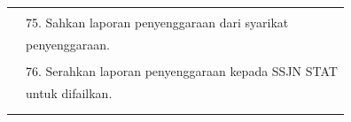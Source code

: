 \documentclass[
]{article}
\begin{document}
\begin{longtable}[]{@{}ll@{}}
\begin{minipage}[t]{0.23\columnwidth}\raggedright
\strut
\end{minipage} & \begin{minipage}[t]{0.71\columnwidth}\raggedright
\strut
\end{minipage}\tabularnewline
\begin{minipage}[t]{0.23\columnwidth}\raggedright
\strut
\end{minipage} & \begin{minipage}[t]{0.71\columnwidth}\raggedright
75. Sahkan laporan penyenggaraan dari syarikat\strut
\end{minipage}\tabularnewline
\begin{minipage}[t]{0.23\columnwidth}\raggedright
\strut
\end{minipage} & \begin{minipage}[t]{0.71\columnwidth}\raggedright
penyenggaraan.\strut
\end{minipage}\tabularnewline
\begin{minipage}[t]{0.23\columnwidth}\raggedright
\strut
\end{minipage} & \begin{minipage}[t]{0.71\columnwidth}\raggedright
\strut
\end{minipage}\tabularnewline
\begin{minipage}[t]{0.23\columnwidth}\raggedright
\strut
\end{minipage} & \begin{minipage}[t]{0.71\columnwidth}\raggedright
76. Serahkan laporan penyenggaraan kepada SSJN STAT\strut
\end{minipage}\tabularnewline
\begin{minipage}[t]{0.23\columnwidth}\raggedright
\strut
\end{minipage} & \begin{minipage}[t]{0.71\columnwidth}\raggedright
untuk difailkan.\strut
\end{minipage}\tabularnewline
\begin{minipage}[t]{0.23\columnwidth}\raggedright
\strut
\end{minipage} & \begin{minipage}[t]{0.71\columnwidth}\raggedright
\strut
\end{minipage}\tabularnewline
\begin{minipage}[t]{0.23\columnwidth}\raggedright
\strut
\end{minipage} & \begin{minipage}[t]{0.71\columnwidth}\raggedright

\end{minipage}
\end{longtable}
\end{document}
